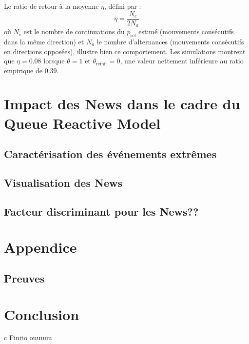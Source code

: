 \documentclass[12pt,a4paper]{article}
\theoremstyle{definition}
\theoremstyle{remark}
\begin{document}
    Le ratio de retour à la moyenne $\eta$, défini par :
    $$\eta = \frac{N_c}{2N_a}$$
    où $N_c$ est le nombre de continuations du $p_{\text{ref}}$ estimé (mouvements consécutifs dans la même direction) et $N_a$ le nombre d'alternances (mouvements consécutifs en directions opposées), illustre bien ce comportement. Les simulations montrent que $\eta = 0.08$ lorsque $\theta = 1$ et $\theta_{\text{reinit}} = 0$, une valeur nettement inférieure au ratio empirique de $0.39$.

    \newpage
    \vspace*{5cm}
    \section{Impact des News dans le cadre du Queue Reactive Model}
    \vspace*{2cm}

    \subsection{Caractérisation des événements extrêmes}

    \subsection{Visualisation des News}

    \subsection{Facteur discriminant pour les News??}



    \newpage
    \vspace*{5cm}
    \section*{Appendice}
    \vspace*{2cm}
    \subsection*{Preuves}


    \newpage
    \vspace*{5cm}
    \section*{Conclusion}
    \vspace*{2cm}
    c Finito ouuuuu
    \newpage
    \vspace*{5cm}
\end{document}
